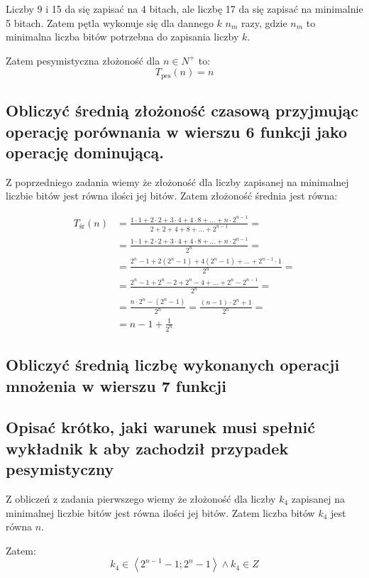 \documentclass[a4paper,12pt]{article}
\begin{document}
Liczby 9 i 15 da się zapisać na 4 bitach, ale liczbę 17 da się zapisać na minimalnie 5 bitach. Zatem pętla wykonuje
się dla dannego $k$ $n_m$ razy, gdzie $n_m$ to minimalna liczba bitów potrzebna do zapisania liczby $k$. 

Zatem pesymistyczna złożoność dla $n \in N^+$ to:
\[T_\text{pes}(n) = n\]

\subsection{Obliczyć średnią złożoność czasową przyjmując operację porównania w wierszu 6
funkcji jako operację dominującą.}

Z poprzedniego zadania wiemy że złożoność dla liczby zapisanej na minimalnej liczbie bitów jest
równa ilości jej bitów. Zatem złożoność średnia jest równa:

\begin{align*}
 T_\text{śr}(n) &= \frac{1 \cdot 1 + 2\cdot2 + 3 \cdot 4 + 4 \cdot 8 + \dots + n\cdot2^{n -  1}}{2 + 2 + 4 + 8 + \dots +
 2^{n - 1}} = \\
 &= \frac{1 \cdot 1 + 2\cdot2 + 3 \cdot 4 + 4 \cdot 8 + \dots + n\cdot2^{n -  1}}{2^n} = \\
 &= \frac{2^n - 1 + 2\left(2^n-1\right) + 4 \left( 2^n-1 \right) + \dots + 2^{n-1}\cdot 1}{2^n} = \\
 &= \frac{2^n - 1 + 2^n - 2 + 2^n - 4 + \dots + 2^n - 2^{n-1}}{2^n} =  \\
 &= \frac{n\cdot2^n - \left(2^n -1\right)}{2^n} = \frac{\left(n-1\right)\cdot2^n + 1}{2^n} =\\
 &= n-1 + \frac{1}{2^n}
\end{align*}

\subsection{Obliczyć średnią liczbę wykonanych operacji mnożenia w wierszu 7 funkcji}

\subsection{Opisać  krótko,  jaki  warunek  musi  spełnić  wykładnik k aby  zachodził  przypadek pesymistyczny}

Z obliczeń z zadania pierwszego wiemy że złożoność dla liczby $k_4$ zapisanej na minimalnej liczbie bitów jest
równa ilości jej bitów. Zatem liczba bitów $k_4$ jest równa $n$.

Zatem:
\[ k_4 \in \left\langle 2^{n-1} - 1; 2^n - 1 \right\rangle \wedge k_4 \in Z\]
\end{document}

